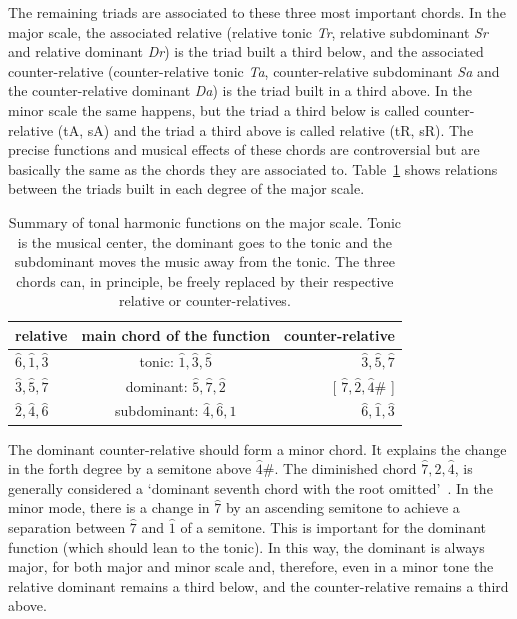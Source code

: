 The remaining triads are associated to these three most important chords. In the major scale, the associated relative (relative tonic \textit{Tr}, relative
subdominant \textit{Sr} and relative dominant \textit{Dr}) is the triad built a third below, and the associated counter-relative (counter-relative tonic \textit{Ta}, counter-relative subdominant \textit{Sa} and the counter-relative dominant \textit{Da}) is the triad built in a third above. In the minor scale the same happens, but the triad a third below is called counter-relative (tA, sA) and the triad a third above is called relative (tR,
sR). The precise functions and musical effects of these chords are
controversial but are basically the same as the chords they are associated to. Table~\ref{tab:harmonia} shows relations between the triads built in each degree of the major scale.

\begin{table}[htp!]
\centering
\caption{Summary of tonal harmonic functions on the major scale. Tonic is the musical center, the dominant goes to the tonic and the subdominant moves the music away from
the tonic. The three chords can, in principle, be freely replaced by their
respective relative or counter-relatives.}
\begin{tabular}{l | c | r}
relative & main chord of the function & counter-relative \\\hline\hline
$\hat{6},\hat{1},\hat{3}$ & tonic:       $\hat{1},\hat{3},\hat{5}$ & $\hat{3}, \hat{5},      \hat{7}$ \\
$\hat{3},\hat{5},\hat{7}$ & dominant:    $\hat{5},\hat{7},\hat{2}$ & [ $\hat{7},\hat{2},\hat{4}\#$ ] \\
$\hat{2},\hat{4},\hat{6}$ & subdominant: $\hat{4},\hat{6},\hat{1}$ & $\hat{6},\hat{1},       \hat{3}$
\end{tabular}
\label{tab:harmonia}
\end{table}

The dominant counter-relative should form a minor chord. It explains the change in the forth degree by a semitone above $\hat{4}\#$. The diminished chord
$\hat{7},\hat{2},\hat{4}$, is generally considered a `dominant seventh chord with the root omitted'~\cite{Koellheuteur}.
In the minor mode, there is a change in $\hat{7}$ by an ascending semitone to achieve a separation between $\hat{7}$ and $\hat{1}$ of a semitone. This is important for the dominant function (which should lean to the tonic). In this way, the dominant is always major, for both major and minor scale and, therefore, even in a minor tone the relative dominant remains a third below, and the counter-relative remains a third above.

